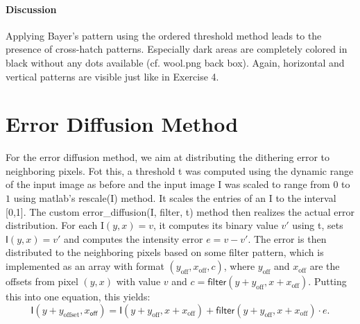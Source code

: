 \documentclass{article}
\begin{document}
\paragraph{Discussion} Applying Bayer's pattern using the ordered threshold method leads to the presence of cross-hatch patterns. Especially dark areas are completely colored in black without any dots available (cf. \textsf{wool.png} back box). Again, horizontal and vertical patterns are visible just like in Exercise 4.
\section{Error Diffusion Method}
For the error diffusion method, we aim at distributing the dithering error to neighboring pixels. Fot this, a threshold \textsf{t} was computed using the dynamic range of the input image as before and the input image \textsf{I} was scaled to range from $0$ to $1$ using matlab's \textsf{rescale(I)} method. It scales the entries of an \textsf{I} to the interval [0,1]. The custom \textsf{error\_diffusion(I, filter, t)} method then realizes the actual error distribution. For each \textsf{I}$(y, x) = v$, it computes its binary value $v'$ using \textsf{t}, sets $\textsf{I}(y, x) = v'$ and computes the intensity error $e = v - v'$. The error is then distributed to the neighboring pixels based on some filter pattern, which is implemented as an array with format $(y_{\text{off}}, x_{\text{off}}, c)$, where $y_{\text{off}}$ and $x_{\text{off}}$ are the offsets from pixel $(y, x)$ with value $v$ and $c = \textsf{filter}(y + y_{\text{off}}, x + x_{\text{off}})$. Putting this into one equation, this yields:
\begin{equation*}
    \textsf{I}(y + y_{\text{offset}}, x_{\textsf{off}}) = \textsf{I}(y + y_{\text{off}}, x + x_{\text{off}}) + \textsf{filter}(y + y_{\text{off}}, x + x_{\text{off}}) \cdot e.
\end{equation*}
\end{document}
